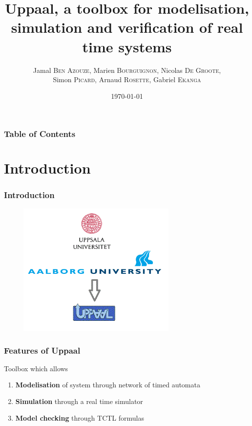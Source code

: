 \documentclass{beamer}
\title{Uppaal, a toolbox for modelisation, simulation and verification of real time systems}
\author{Jamal \textsc{Ben Azouze}, Marien \textsc{Bourguignon}, Nicolas \textsc{De Groote}, \\Simon \textsc{Picard}, Arnaud \textsc{Rosette}, Gabriel \textsc{Ekanga}}
\date{\today}
\begin{document}
\maketitle


\begin{frame}
\frametitle{Table of Contents}
\tableofcontents
\end{frame}

\section{Introduction}
\begin{frame}
	\frametitle{Introduction}
	\begin{figure}
    	\centering
    	\includegraphics[width = 0.7\textwidth]{Uppaal.png}
  	\end{figure}
\end{frame}

\begin{frame}
	\frametitle{Features of Uppaal}
	\begin{block}{Toolbox which allows}
		\begin{enumerate}
			\item \textbf{Modelisation} of system through network of timed automata
			\item \textbf{Simulation} through a real time simulator 
			\item \textbf{Model checking} through TCTL formulas 
		\end{enumerate}
	\end{block}
\end{frame}
\end{document}
